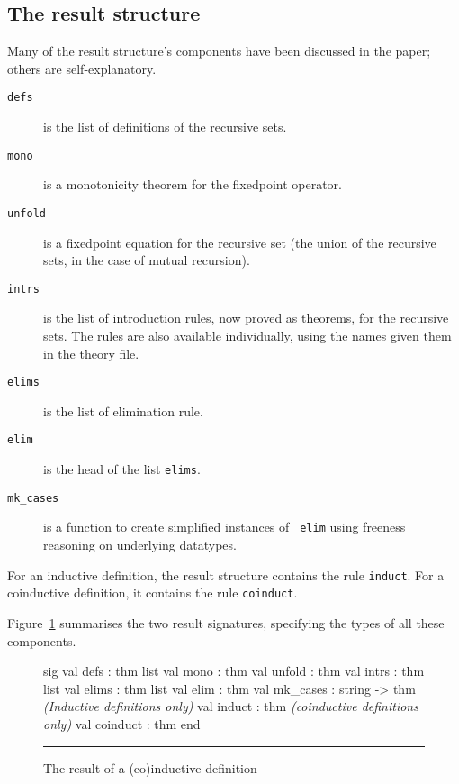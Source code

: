 \subsection{The result structure}
Many of the result structure's components have been discussed in the paper;
others are self-explanatory.
\begin{description}
\item[\tt defs] is the list of definitions of the recursive sets.

\item[\tt mono] is a monotonicity theorem for the fixedpoint operator.

\item[\tt unfold] is a fixedpoint equation for the recursive set (the union of
the recursive sets, in the case of mutual recursion).

\item[\tt intrs] is the list of introduction rules, now proved as theorems, for
the recursive sets.  The rules are also available individually, using the
names given them in the theory file. 

\item[\tt elims] is the list of elimination rule.

\item[\tt elim] is the head of the list \texttt{elims}.
  
\item[\tt mk_cases] is a function to create simplified instances of {\tt
elim} using freeness reasoning on underlying datatypes.
\end{description}

For an inductive definition, the result structure contains the
rule \texttt{induct}.  For a
coinductive definition, it contains the rule \verb|coinduct|.

Figure~\ref{def-result-fig} summarises the two result signatures,
specifying the types of all these components.

\begin{figure}
\begin{ttbox}
sig
val defs         : thm list
val mono         : thm
val unfold       : thm
val intrs        : thm list
val elims        : thm list
val elim         : thm
val mk_cases     : string -> thm
{\it(Inductive definitions only)} 
val induct       : thm
{\it(coinductive definitions only)}
val coinduct     : thm
end
\end{ttbox}
\hrule
\caption{The {\ML} result of a (co)inductive definition} \label{def-result-fig}
\end{figure}

